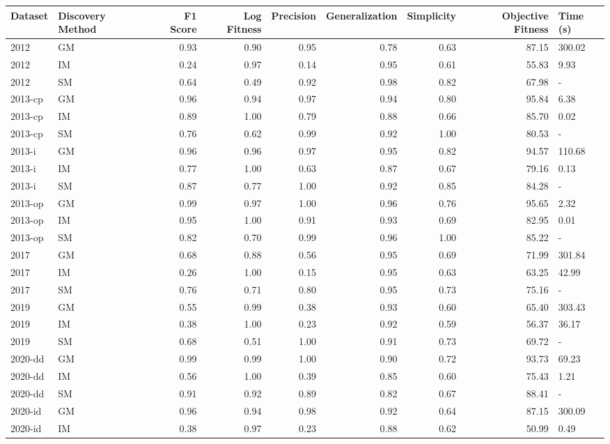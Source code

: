 \begin{tabular}{llrrrrrrl}
\toprule
Dataset & Discovery Method & F1 Score & Log Fitness & Precision & Generalization & Simplicity & Objective Fitness & Time (s) \\
\midrule
2012 & GM & 0.93 & 0.90 & 0.95 & 0.78 & 0.63 & 87.15 & 300.02 \\
2012 & IM & 0.24 & 0.97 & 0.14 & 0.95 & 0.61 & 55.83 & 9.93 \\
2012 & SM & 0.64 & 0.49 & 0.92 & 0.98 & 0.82 & 67.98 & - \\
2013-cp & GM & 0.96 & 0.94 & 0.97 & 0.94 & 0.80 & 95.84 & 6.38 \\
2013-cp & IM & 0.89 & 1.00 & 0.79 & 0.88 & 0.66 & 85.70 & 0.02 \\
2013-cp & SM & 0.76 & 0.62 & 0.99 & 0.92 & 1.00 & 80.53 & - \\
2013-i & GM & 0.96 & 0.96 & 0.97 & 0.95 & 0.82 & 94.57 & 110.68 \\
2013-i & IM & 0.77 & 1.00 & 0.63 & 0.87 & 0.67 & 79.16 & 0.13 \\
2013-i & SM & 0.87 & 0.77 & 1.00 & 0.92 & 0.85 & 84.28 & - \\
2013-op & GM & 0.99 & 0.97 & 1.00 & 0.96 & 0.76 & 95.65 & 2.32 \\
2013-op & IM & 0.95 & 1.00 & 0.91 & 0.93 & 0.69 & 82.95 & 0.01 \\
2013-op & SM & 0.82 & 0.70 & 0.99 & 0.96 & 1.00 & 85.22 & - \\
2017 & GM & 0.68 & 0.88 & 0.56 & 0.95 & 0.69 & 71.99 & 301.84 \\
2017 & IM & 0.26 & 1.00 & 0.15 & 0.95 & 0.63 & 63.25 & 42.99 \\
2017 & SM & 0.76 & 0.71 & 0.80 & 0.95 & 0.73 & 75.16 & - \\
2019 & GM & 0.55 & 0.99 & 0.38 & 0.93 & 0.60 & 65.40 & 303.43 \\
2019 & IM & 0.38 & 1.00 & 0.23 & 0.92 & 0.59 & 56.37 & 36.17 \\
2019 & SM & 0.68 & 0.51 & 1.00 & 0.91 & 0.73 & 69.72 & - \\
2020-dd & GM & 0.99 & 0.99 & 1.00 & 0.90 & 0.72 & 93.73 & 69.23 \\
2020-dd & IM & 0.56 & 1.00 & 0.39 & 0.85 & 0.60 & 75.43 & 1.21 \\
2020-dd & SM & 0.91 & 0.92 & 0.89 & 0.82 & 0.67 & 88.41 & - \\
2020-id & GM & 0.96 & 0.94 & 0.98 & 0.92 & 0.64 & 87.15 & 300.09 \\
2020-id & IM & 0.38 & 0.97 & 0.23 & 0.88 & 0.62 & 50.99 & 0.49 \\

\end{tabular}
